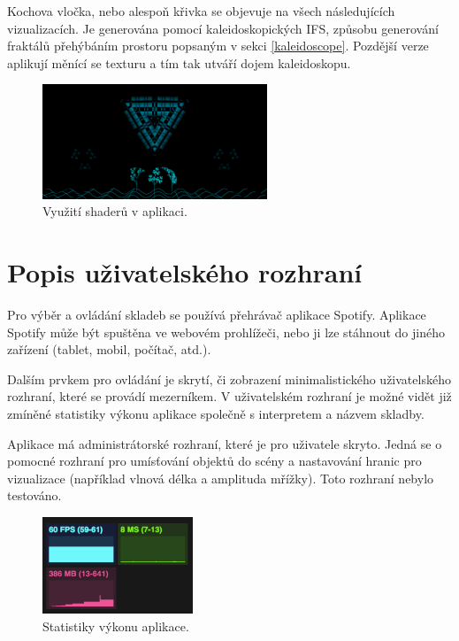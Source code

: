 \documentclass[thesis=B, czech]{FITthesis}[2019/03/06]
\begin{document}
Kochova vločka, nebo alespoň křivka se objevuje na všech následujících vizualizacích. Je generována pomocí kaleidoskopických IFS, způsobu generování fraktálů přehýbáním prostoru popsaným v sekci \ref{kaleidoscope}. Pozdější verze aplikují měnící se texturu a tím tak utváří dojem kaleidoskopu.

\begin{figure}[h]
\centering
    \includegraphics[width=0.6\textwidth]{images/previous_versions/shader02.png}
    \caption{ \label{fig:shader}Využití shaderů v aplikaci.}
\end{figure}
\section{Popis uživatelského rozhraní}

Pro výběr a ovládání skladeb se používá přehrávač aplikace Spotify. Aplikace Spotify může být spuštěna ve webovém prohlížeči, nebo ji lze stáhnout do jiného zařízení (tablet, mobil, počítač, atd.).

Dalším prvkem pro ovládání je skrytí, či zobrazení minimalistického uživatelského rozhraní, které se provádí mezerníkem. V uživatelském rozhraní je možné vidět již zmíněné statistiky výkonu aplikace společně s interpretem a názvem skladby.

Aplikace má administrátorské rozhraní, které je pro uživatele skryto. Jedná se o pomocné rozhraní pro umísťování objektů do scény a nastavování hranic pro vizualizace (například vlnová délka a amplituda mřížky). Toto rozhraní nebylo testováno.


\begin{figure}[h]
\centering
    \includegraphics[width=0.4\textwidth]{images/previous_versions/stats.png}
    \caption{ \label{fig:shader}Statistiky výkonu aplikace.}
\end{figure}
\end{document}
